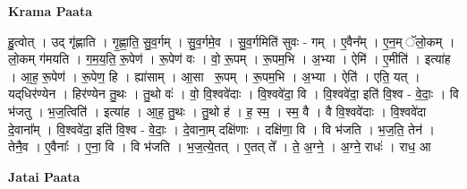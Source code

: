 \documentclass[17pt]{extarticle}
\begin{document}
\textbf{Krama Paata} \newline

हु॒त्वोत् । उद् गृ॑ह्णाति । गृ॒ह्णा॒ति॒ सु॒व॒र्गम् । सु॒व॒र्गमे॒व । सु॒व॒र्गमिति॑ सुवः - गम् । ए॒वैन᳚म् । ए॒न॒म् ॅलो॒कम् । लो॒कम् ग॑मयति । ग॒म॒य॒ति॒ रू॒पेण॑ । रू॒पेण॑ वः । वो॒ रू॒पम् । रू॒पम॒भि । अ॒भ्या । ऐमि॑ । ए॒मीति॑ । इत्या॑ह । आ॒ह॒ रू॒पेण॑ । रू॒पेण॒ हि । ह्या॑साम् । आ॒साꣳ॒᳡ रू॒पम् । रू॒पम॒भि । अ॒भ्या । ऐति॑ । एति॒ यत् । यद्‌धिर॑ण्येन । हिर॑ण्येन तु॒थः । तु॒थो वः॑ । वो॒ वि॒श्ववे॑दाः । वि॒श्ववे॑दा॒ वि । वि॒श्ववे॑दा॒ इति॑ वि॒श्व - वे॒दाः॒ । वि भ॑जतु । भ॒ज॒त्विति॑ । इत्या॑ह । आ॒ह॒ तु॒थः । तु॒थो ह॑ । ह॒ स्म॒ । स्म॒ वै । वै वि॒श्ववे॑दाः । वि॒श्ववे॑दा दे॒वाना᳚म् । वि॒श्ववे॑दा॒ इति॑ वि॒श्व - वे॒दाः॒ । दे॒वाना॒म् दक्षि॑णाः । दक्षि॑णा॒ वि । वि भ॑जति । भ॒ज॒ति॒ तेन॑ । तेनै॒व । ए॒वैनाः᳚ । ए॒ना॒ वि । वि भ॑जति । भ॒ज॒त्ये॒तत् । ए॒तत् ते᳚ । ते॒ अ॒ग्ने॒ । अ॒ग्ने॒ राधः॑ । राध॒ आ \newline

\textbf{Jatai Paata} \newline
\end{document}
